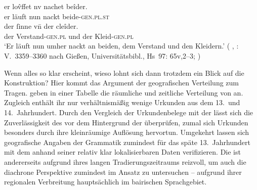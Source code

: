 \begin{exe}
\ex \label{ex:gendatconj}
	\begin{xlist}
	\ex \label{ex:gendatconj_1}
		\gll er lov̂ffet nv nachet beîder. \\
			er läuft nun nackt beide-\textsc{gen.pl.st} \\
	\sn \gll der ſinne vn̄ der cleîder. \\
			der Verstand-\textsc{gen.pl} und der
				Kleid-\textsc{gen.pl} \\
		\trans `Er läuft nun umher nackt an beiden, dem
			Verstand und den Kleidern.'
			(%
				, : V.~3359--3360 nach
				Gießen, Universitätsbibl., Hs~97: 65v,2--3;
				\cite[vgl.][500]{mertens2004}%
			)

	\end{xlist}
\end{exe}
%

Wenn alles so klar erscheint, wieso lohnt sich dann trotzdem ein Blick auf die
Konstruktion? Hier kommt das Argument der geografischen
Verteilung zum Tragen. \citet[627]{ksw2} geben in
einer Tabelle die räumliche und zeitliche Verteilung
von  an. Zugleich enthält ihr  nur verhältnismäßig
wenige Urkunden aus dem 13.\ und 14.\ Jahrhundert. Durch den
Vergleich der Urkundenbelege mit der  lässt
sich die Zuverlässigkeit des \CAO{} vor dem Hintergrund der
 überprüfen, zumal sich Urkunden besonders durch ihre
kleinräumige Auflösung hervortun. Umgekehrt lassen sich geografische Angaben
der Grammatik zumindest für das späte 13.~Jahrhundert mit dem \CAO{} anhand
seiner relativ klar lokalisierbaren Daten verifizieren. Die \KC{} ist
andererseits aufgrund ihres langen Tradierungs\-zeitraums reizvoll, um auch die
diachrone Perspektive zumindest im Ansatz zu untersuchen -- aufgrund ihrer
regionalen Verbreitung hauptsächlich im bairischen Sprachgebiet.

